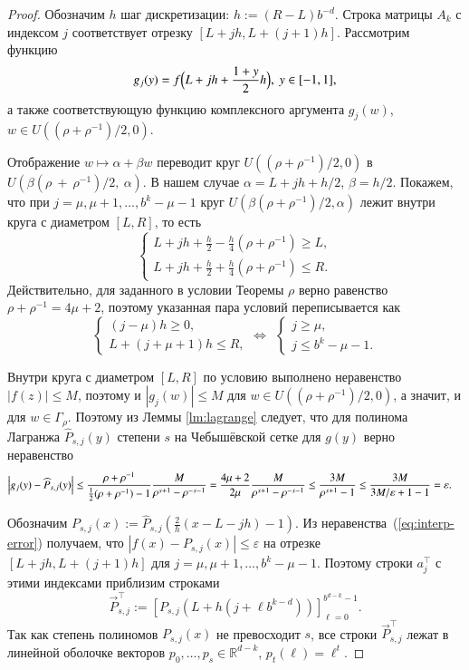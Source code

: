 \documentclass[3p]{cmmp}%
\numberwithin{equation}{section}
\begin{document}
\begin{proof}
	Обозначим $h$ шаг дискретизации: $h := (R-L)b^{-d}$.
	Строка матрицы $A_k$ с индексом $j$ соответствует отрезку $\left[L+jh, L+ (j+1)h\right]$.
	Рассмотрим функцию
	\[
	g_j(y) = f\Bigl(L+ jh + \frac{1+ y}{2}h \Bigr),~ y \in [-1,1],
	\]
	а также соответствующую функцию комплексного аргумента $g_j(w)$, 
	$ w \in U\left(\left(\rho + \rho^{-1}\right)/2, 0\right)$.
	
	Отображение $w \mapsto \alpha + \beta w$ переводит круг $U((\rho + \rho^{-1})/2, 0)$ в $U(\beta(\rho~+~\rho^{-1})/2,~\alpha)$.
	В нашем случае $\alpha = L + jh + h/2$, $\beta = h/2$.
	Покажем, что при $j = \mu, \mu + 1, \dots, b^k-\mu-1$ круг $U(\beta(\rho + \rho^{-1})/2, \alpha)$ лежит внутри круга с диаметром $[L,R]$, то есть 
	\[
	\begin{cases}
	L+jh + \frac{h}{2} - \frac{h}{4}\left(\rho+ \rho^{-1}\right) \geq L, \\
	L+jh + \frac{h}{2} + \frac{h}{4}\left(\rho+ \rho^{-1}\right) \leq R.
	\end{cases}
	\]
	Действительно, для заданного в условии Теоремы $\rho$ верно равенство $\rho + \rho^{-1} = 4\mu + 2$, поэтому указанная пара условий переписывается как 
	\[
	\begin{cases}
		(j-\mu)h \geq 0, \\
	L+(j+\mu+1)h \leq R,

	\end{cases}
	\Leftrightarrow
	~~
	\begin{cases}
	j \geq \mu, \\
	j \leq b^k - \mu - 1.
	\end{cases}
	\]
	
	Внутри круга с диаметром $[L, R]$ по условию выполнено неравенство $|f(z)| \leq M$, поэтому и $|g_j(w)| \leq M$ для $w \in U((\rho + \rho^{-1})/2, 0)$, а значит, и для $w \in \Gamma_\rho$.
	Поэтому из Леммы \ref{lm:lagrange} следует, что для полинома Лагранжа $\widehat{P}_{s,j}(y)$ степени $s$ на Чебышёвской сетке для $g(y)$ верно неравенство
	\begin{align}\label{eq:interp-error}
	\Bigl|g_j(y)-\widehat{P}_{s,j}(y)\Bigr|
	&\le
	\frac{\rho + \rho^{-1}}{\frac{1}{2}(\rho + \rho^{-1})-1}\frac{M}{\rho^{s+1} - \rho^{-s-1}}
	=
	\frac{4\mu + 2}{2\mu} \frac{M}{\rho^{s+1} - \rho^{-s-1}} 
	\le
	\frac{3M}{\rho^{s+1} - 1}
	\le
	\frac{3M}{3M/\varepsilon + 1 - 1} = \varepsilon.
	\end{align}
	
	Обозначим $P_{s,j}(x) := \widehat{P}_{s,j}\left(\frac{2}{h}(x-L-jh)-1\right)$. 
	Из неравенства~(\ref{eq:interp-error}) получаем, что $|f(x)-P_{s,j}(x)| \leq \varepsilon$ на отрезке $\left[L+jh, L+ (j+1)h\right]$ для $j = \mu, \mu + 1, \dots, b^k - \mu - 1$.
	Поэтому строки $a_j^\top$ с этими индексами приблизим строками
	\[
	\vec{P}_{s,j}^\top := \left[P_{s,j}\left(L + h\left(j + \ell b^{k-d}\right)\right)\right]_{\ell=0}^{b^{d-k}-1}.
	\]
	Так как степень полиномов $P_{s,j}(x)$ не превосходит $s$, все строки $\vec{P}_{s,j}^\top$  лежат в линейной оболочке векторов $p_0, \dots, p_s \in \mathbb{R}^{d-k}$, $p_t(\ell) = \ell^t$.
	

\end{proof}
\end{document}

